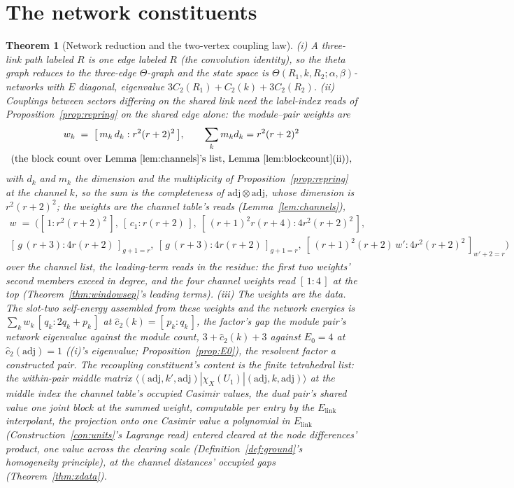 \documentclass[11pt]{article}
\newtheorem{theorem}{Theorem}
\theoremstyle{definition}
\begin{document}
\section{The network constituents}

\begin{theorem}[Network reduction and the two-vertex coupling law]
\label{thm:network}
(i) A three-link path labeled $R$ is one edge
labeled $R$ (the convolution identity), so the
theta graph reduces to the three-edge $\Theta$-graph and the state
space is $\Theta(R_1,k,R_2;\alpha,\beta)$-networks with $E$
diagonal, eigenvalue $3C_2(R_1)+C_2(k)+3C_2(R_2)$.
(ii) Couplings between sectors differing on the shared link need
the label-index reads of Proposition~\ref{prop:repring} on the shared edge
alone: the
module--pair weights are
\[
\begin{gathered}
w_k\;=\;\big[\,m_k\,d_k:r^2(r+2)^2\,\big],\qquad
\sum_k m_kd_k=r^2(r+2)^2\\
\text{(the block count over
Lemma~\ref{lem:channels}'s list, Lemma~\ref{lem:blockcount}(ii))},
\end{gathered}
\]
with $d_k$ and $m_k$ the dimension and the multiplicity of
Proposition~\ref{prop:repring} at the channel $k$, so the sum is the
completeness of $\mathrm{adj}\otimes\mathrm{adj}$, whose dimension is
$r^2(r+2)^2$; the weights are the channel table's reads
(Lemma~\ref{lem:channels}),
\[
\begin{gathered}
w\;=\;\Big([\,1:r^2(r+2)^2\,],\ [\,c_1:r(r+2)\,],\
[\,(r+1)^2r(r+4):4r^2(r+2)^2\,],\\
[\,g\,(r+3):4r(r+2)\,]_{g+1=r},\
[\,g\,(r+3):4r(r+2)\,]_{g+1=r},\
[\,(r+1)^2(r+2)\,w':4r^2(r+2)^2\,]_{w'+2=r}\Big)
\end{gathered}
\]
over the channel list, the leading-term reads in the residue: the
first two weights' second members exceed in degree, and the four
channel weights read $[\,1:4\,]$ at the top
(Theorem~\ref{thm:windowsep}'s leading terms).
(iii) \emph{The weights are the data.} The slot-two self-energy assembled from
these weights and the network energies is
$\sum_kw_k\,[\,q_k:2q_k+p_k\,]$ at $\hat c_2(k)=[\,p_k:q_k\,]$, the
factor's gap the module pair's network eigenvalue against the
module count, $3+\hat c_2(k)+3$ against $E_0=4$ at
$\hat c_2(\mathrm{adj})=1$ ((i)'s eigenvalue;
Proposition~\ref{prop:E0}), the resolvent factor a constructed
pair. The recoupling constituent's content is the finite
tetrahedral list: the within-pair middle matrix
$\langle(\mathrm{adj},k',\mathrm{adj})|\chi_X(U_1)|
(\mathrm{adj},k,\mathrm{adj})\rangle$ at the middle index the
channel table's occupied Casimir values, the dual pair's shared
value one joint block at the summed weight, computable per entry
by the $E_{\mathrm{link}}$ interpolant, the projection onto one
Casimir value a polynomial in $E_{\mathrm{link}}$
(Construction~\ref{con:units}'s Lagrange read) entered cleared at
the node differences' product, one value across the clearing
scale (Definition~\ref{def:ground}'s homogeneity principle), at
the channel distances' occupied gaps (Theorem~\ref{thm:xdata}).
\end{theorem}
\end{document}
